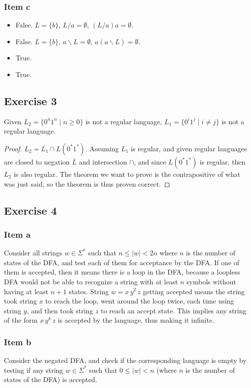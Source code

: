 {\subsubsection{Item c}
\begin{itemize}
	\item False. $L=\{b\}$, $L/a=\emptyset$, $(L/a)a=\emptyset$.
	\item False. $L=\{b\}$, $a \backslash L = \emptyset$, $a(a \backslash L)=\emptyset$.
	\item True.
	\item True.
\end{itemize}
\subsection{Exercise 3}
\begin{theorem}
Given $L_2=\{0^n1^n\mid n \geq 0\}$ is not a regular language, $L_1=\{0^i1^j\mid i \neq j\}$ is not a regular language.
\end{theorem}
\begin{proof}
$L_2=\overline{L_1} \cap L(0^*1^*)$. Assuming $L_1$ is regular, and given regular languages are closed to negation $\overline{L}$ and intersection $\cap$, and since $L(0^*1^*)$ is regular, then $L_2$ is also regular. The theorem we want to prove is the contrapositive of what was just said, so the theorem is thus proven correct.
\end{proof}
\subsection{Exercise 4}
\subsubsection{Item a}
Consider all strings $w \in \Sigma^*$ such that $n \leq |w| < 2n$ where $n$ is the number of states of the DFA, and test each of them for acceptance by the DFA. If one of them is accepted, then it means there is a loop in the DFA, because a loopless DFA would not be able to recognize a string with at least $n$ symbols without having at least $n+1$ states. String $w=x\,y^2\,z$ getting accepted means the string took string $x$ to reach the loop, went around the loop twice, each time using string $y$, and then took string $z$ to reach an accept state. This implies any string of the form $x\,y^k\,z$ is accepted by the language, thus making it infinite.
\subsubsection{Item b}
Consider the negated DFA, and check if the corresponding language is empty by testing if any string $w \in \Sigma^*$ such that $0 \leq |w| < n$ (where $n$ is the number of states of the DFA) is accepted.
}

